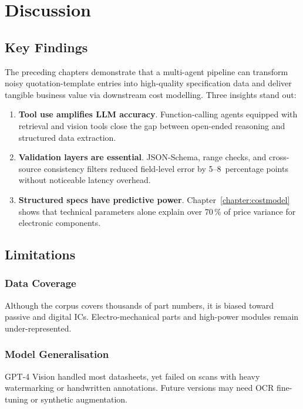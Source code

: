 \chapter{Discussion}
\label{chapter:discussion}

\section{Key Findings}
The preceding chapters demonstrate that a multi-agent pipeline can transform noisy quotation-template entries into high-quality specification data and deliver tangible business value via downstream cost modelling.  Three insights stand out:
\begin{enumerate}
  \item \textbf{Tool use amplifies LLM accuracy}. Function-calling agents equipped with retrieval and vision tools close the gap between open-ended reasoning and structured data extraction.
  \item \textbf{Validation layers are essential}. JSON-Schema, range checks, and cross-source consistency filters reduced field-level error by 5–8~percentage points without noticeable latency overhead.
  \item \textbf{Structured specs have predictive power}. Chapter~\ref{chapter:costmodel} shows that technical parameters alone explain over 70\,\% of price variance for electronic components.
\end{enumerate}

\section{Limitations}
\subsection{Data Coverage}
Although the corpus covers thousands of part numbers, it is biased toward passive and digital ICs.  Electro-mechanical parts and high-power modules remain under-represented.

\subsection{Model Generalisation}
GPT-4 Vision handled most datasheets, yet failed on scans with heavy watermarking or handwritten annotations.  Future versions may need OCR fine-tuning or synthetic augmentation.

